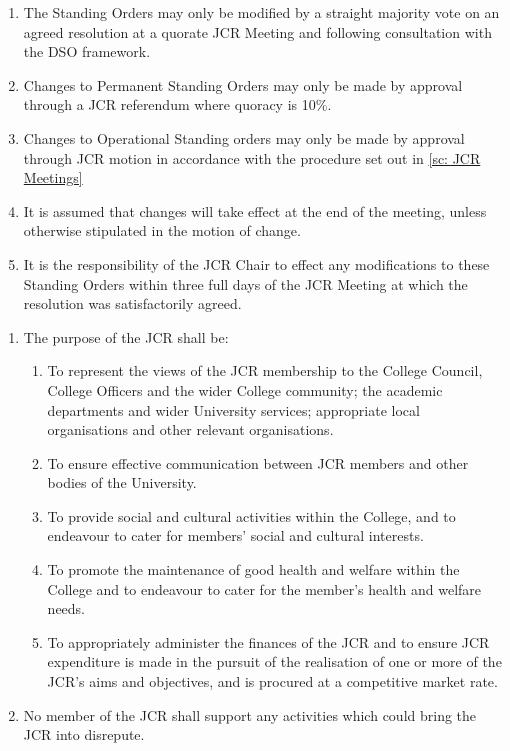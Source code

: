 \begin{enumerate}
    \item The Standing Orders may only be modified by a straight majority vote on an agreed resolution at a quorate JCR Meeting and following consultation with the DSO framework.
    \item Changes to Permanent Standing Orders may only be made by approval through a JCR referendum where quoracy is 10\%.
    \item Changes to Operational Standing orders may only be made by approval through JCR motion in accordance with the procedure set out in \ref{sc: JCR Meetings}
    \item It is assumed that changes will take effect at the end of the meeting, unless otherwise stipulated in the motion of change.
    \item It is the responsibility of the JCR Chair to effect any modifications to these Standing Orders within three full days of the JCR Meeting at which the resolution was satisfactorily agreed. %
\end{enumerate}

\label{sec: Purpose}
\begin{enumerate}
    \item The purpose of the JCR shall be:
    \begin{enumerate}
        \item To represent the views of the JCR membership to the College Council, College Officers and the wider College community; the academic departments and wider University services; appropriate local organisations and other relevant organisations.
        \item To ensure effective communication between JCR members and other bodies of the University.
        \item To provide social and cultural activities within the College, and to endeavour to cater for members’ social and cultural interests.
        \item To promote the maintenance of good health and welfare within the College and to endeavour to cater for the member’s health and welfare needs.
        \item To appropriately administer the finances of the JCR and to ensure JCR expenditure is made in the pursuit of the realisation of one or more of the JCR’s aims and objectives, and is procured at a competitive market rate.
    \end{enumerate}
    \item No member of the JCR shall support any activities which could bring the JCR into disrepute. %
\end{enumerate}

